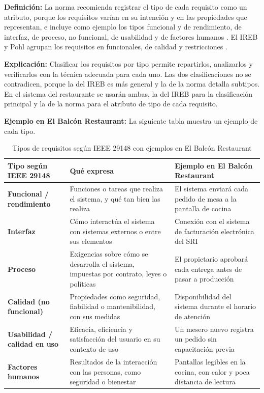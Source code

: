 \textbf{Definición:} La norma recomienda registrar el tipo de cada requisito como un atributo, porque los requisitos varían en su intención y en las propiedades que representan, e incluye como ejemplo los tipos funcional y de rendimiento, de interfaz, de proceso, no funcional, de usabilidad y de factores humanos \cite[\nopp cl.~5.2.8.3]{ieee29148}. El IREB y Pohl agrupan los requisitos en funcionales, de calidad y restricciones \cite{pohl2025,ireb31}.

\textbf{Explicación:} Clasificar los requisitos por tipo permite repartirlos, analizarlos y verificarlos con la técnica adecuada para cada uno. Las dos clasificaciones no se contradicen, porque la del IREB es más general y la de la norma detalla subtipos. En el sistema del restaurante se usarán ambas, la del IREB para la clasificación principal y la de la norma para el atributo de tipo de cada requisito.

\textbf{Ejemplo en El Balcón Restaurant:} La siguiente tabla muestra un ejemplo de cada tipo.

\begin{table}[H]
\centering\footnotesize
\caption{Tipos de requisitos según IEEE 29148 con ejemplos en El Balcón Restaurant}\label{tab:tipos-requisitos}
\begin{tabularx}{\textwidth}{@{}p{}Yp{0.36\textwidth}@{}}
\toprule
\textbf{Tipo según IEEE 29148} & \textbf{Qué expresa} & \textbf{Ejemplo en El Balcón Restaurant}\\
\midrule
\textbf{Funcional / rendimiento} & Funciones o tareas que realiza el sistema, y qué tan bien las realiza & El sistema enviará cada pedido de mesa a la pantalla de cocina\\
\textbf{Interfaz} & Cómo interactúa el sistema con sistemas externos o entre sus elementos & Conexión con el sistema de facturación electrónica del SRI\\
\textbf{Proceso} & Exigencias sobre cómo se desarrolla el sistema, impuestas por contrato, leyes o políticas & El propietario aprobará cada entrega antes de pasar a producción\\
\textbf{Calidad (no funcional)} & Propiedades como seguridad, fiabilidad o mantenibilidad, con sus medidas & Disponibilidad del sistema durante el horario de atención\\
\textbf{Usabilidad / calidad en uso} & Eficacia, eficiencia y satisfacción del usuario en su contexto de uso & Un mesero nuevo registra un pedido sin capacitación previa\\
\textbf{Factores humanos} & Resultados de la interacción con las personas, como seguridad o bienestar & Pantallas legibles en la cocina, con calor y poca distancia de lectura\\
\bottomrule
\end{tabularx}
\end{table}


